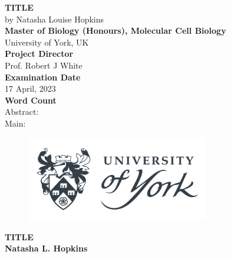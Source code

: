 \documentclass[
  11pt,
]{article}
\author{}
\date{\vspace{-2.5em}}
\begin{document}
\captionsetup{justification=raggedright,singlelinecheck=false}

\begin{center}
\vspace*{2\baselineskip}
\Huge
\textbf{TITLE}\\
\vspace*{1\baselineskip}
\Large{by Natasha Louise Hopkins}\\
\vspace*{2\baselineskip}
\Large{\textbf{Master of Biology (Honours), Molecular Cell Biology}}\\
\Large{University of York, UK}\\
\vspace*{2\baselineskip}
\Large{\textbf{Project Director}}\\
Prof. Robert J White\\
\vspace*{2\baselineskip}
\Large{\textbf{Examination Date}}\\
17 April, 2023\\
\vspace*{2\baselineskip}
\Large{\textbf{Word Count}}\\
Abstract: \\
Main: \\
\vspace*{2\baselineskip}
\begin{figure}[h!]
\centering
  \includegraphics[width=8cm]{../images/uoy_logo.png}
  \label{}
\end{figure}
\end{center}

\hypersetup{linkcolor = black}
\newpage
\tableofcontents
\hypersetup{linkcolor = teal}
\newpage
\setlength{\columnsep}{25pt}
\linespread{2}
\setlength{\parindent}{0pt}
\huge
\textbf{TITLE}\\
\normalsize
\textbf{Natasha L. Hopkins}\\
\end{document}
